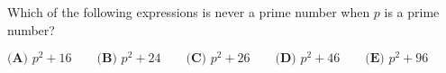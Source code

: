 Which of the following expressions is never a prime number when $p$ is a prime number?

$\textbf{(A) }p^2+16\qquad\textbf{(B) }p^2+24\qquad\textbf{(C) }p^2+26\qquad\textbf{(D) }p^2+46\qquad\textbf{(E) }p^2+96$